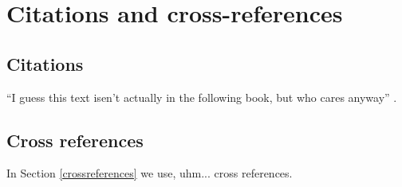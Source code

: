\chapter{Citations and cross-references}

\section{Citations}
``I guess this text isen't actually in the following book, but who
cares anyway'' \citep{proakis96}.

\section{Cross references \label{crossreferences}}

In Section \ref{crossreferences} we use, uhm...  cross references.